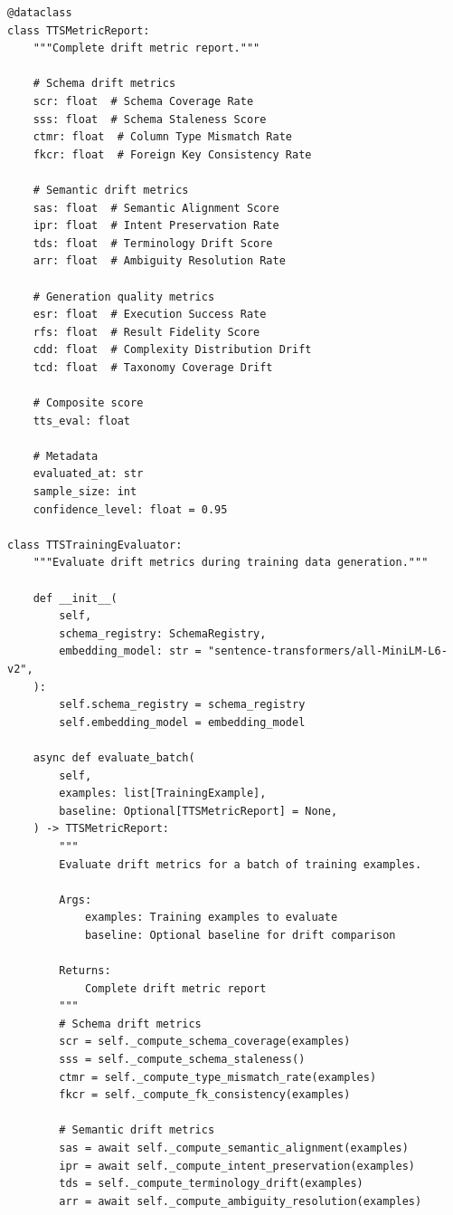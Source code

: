\begin{lstlisting}[language=jsonx,caption={Training-time drift evaluator (simula\_tts\_drift\_evaluator.py)}]
@dataclass
class TTSMetricReport:
    """Complete drift metric report."""
    
    # Schema drift metrics
    scr: float  # Schema Coverage Rate
    sss: float  # Schema Staleness Score
    ctmr: float  # Column Type Mismatch Rate
    fkcr: float  # Foreign Key Consistency Rate
    
    # Semantic drift metrics
    sas: float  # Semantic Alignment Score
    ipr: float  # Intent Preservation Rate
    tds: float  # Terminology Drift Score
    arr: float  # Ambiguity Resolution Rate
    
    # Generation quality metrics
    esr: float  # Execution Success Rate
    rfs: float  # Result Fidelity Score
    cdd: float  # Complexity Distribution Drift
    tcd: float  # Taxonomy Coverage Drift
    
    # Composite score
    tts_eval: float
    
    # Metadata
    evaluated_at: str
    sample_size: int
    confidence_level: float = 0.95

class TTSTrainingEvaluator:
    """Evaluate drift metrics during training data generation."""
    
    def __init__(
        self,
        schema_registry: SchemaRegistry,
        embedding_model: str = "sentence-transformers/all-MiniLM-L6-v2",
    ):
        self.schema_registry = schema_registry
        self.embedding_model = embedding_model
    
    async def evaluate_batch(
        self,
        examples: list[TrainingExample],
        baseline: Optional[TTSMetricReport] = None,
    ) -> TTSMetricReport:
        """
        Evaluate drift metrics for a batch of training examples.
        
        Args:
            examples: Training examples to evaluate
            baseline: Optional baseline for drift comparison
            
        Returns:
            Complete drift metric report
        """
        # Schema drift metrics
        scr = self._compute_schema_coverage(examples)
        sss = self._compute_schema_staleness()
        ctmr = self._compute_type_mismatch_rate(examples)
        fkcr = self._compute_fk_consistency(examples)
        
        # Semantic drift metrics
        sas = await self._compute_semantic_alignment(examples)
        ipr = await self._compute_intent_preservation(examples)
        tds = self._compute_terminology_drift(examples)
        arr = await self._compute_ambiguity_resolution(examples)
        

\end{lstlisting}

